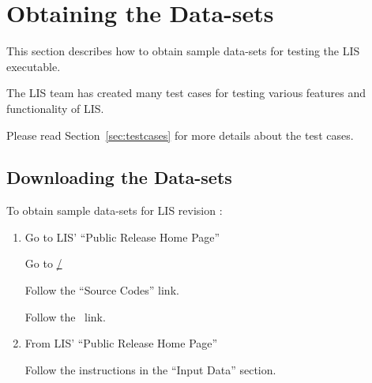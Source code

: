 
\section{Obtaining the Data-sets} \label{sec:obtain-data}

This section describes how to obtain sample data-sets for testing
the LIS executable.

The LIS team has created many test cases for testing various features and
functionality of LIS.

Please read Section~\ref{sec:testcases} for more details about the test cases.

\subsection{Downloading the Data-sets} \label{sec:downloaddata}
To obtain sample data-sets for LIS revision \lisrevision:

\begin{enumerate}
   \item Go to LIS' ``Public Release Home Page''

         Go to \hyperref{\lisurl/}{}{}{\lisurl/}
 
         Follow the ``Source Codes'' link.

         Follow the \lispublicrelease\ link.

   \item From LIS' ``Public Release Home Page''

         Follow the instructions in the ``Input Data'' section.

\end{enumerate}


